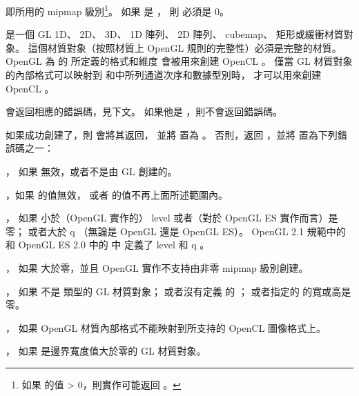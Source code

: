  即所用的 mipmap 級別\footnote{%
如果  的值 > 0，則實作可能返回 。}。
如果  是 ，
則  必須是 0。

 是一個 GL 1D、 2D、 3D、 1D 陣列、 2D 陣列、 cubemap、 矩形或緩衝材質對象。
這個材質對象（按照材質上 OpenGL 規則的完整性）必須是完整的材質。
OpenGL 為  的  所定義的格式和維度
會被用來創建 OpenCL 。
僅當 GL 材質對象的內部格式可以映射到
和中所列通道次序和數據型別時，
才可以用來創建 OpenCL 。

 會返回相應的錯誤碼，見下文。
如果他是 ，則不會返回錯誤碼。

如果成功創建了，則  會將其返回，
並將  置為 。
否則，返回 ，並將  置為下列錯誤碼之一：
\startigBase
\item {}，
如果  無效，或者不是由 GL 創建的。

\item {}，如果  的值無效，
或者  的值不再上面所述範圍內。

\item {}，
如果  小於（OpenGL 實作的） level 或者（對於 OpenGL ES 實作而言）是零；
或者大於 q （無論是 OpenGL 還是 OpenGL ES）。
 OpenGL 2.1 規範中的{} 和 OpenGL ES 2.0 中的{} 中
定義了 level 和 q 。

\item {}，
如果  大於零，並且 OpenGL 實作不支持由非零 mipmap 級別創建。

\item {}，
如果  不是  類型的 GL 材質對象；
或者沒有定義  的 ；
或者指定的  的寬或高是零。

\item {}，
如果 OpenGL 材質內部格式不能映射到所支持的 OpenCL 圖像格式上。

\item {}，
如果  是邊界寬度值大於零的 GL 材質對象。

